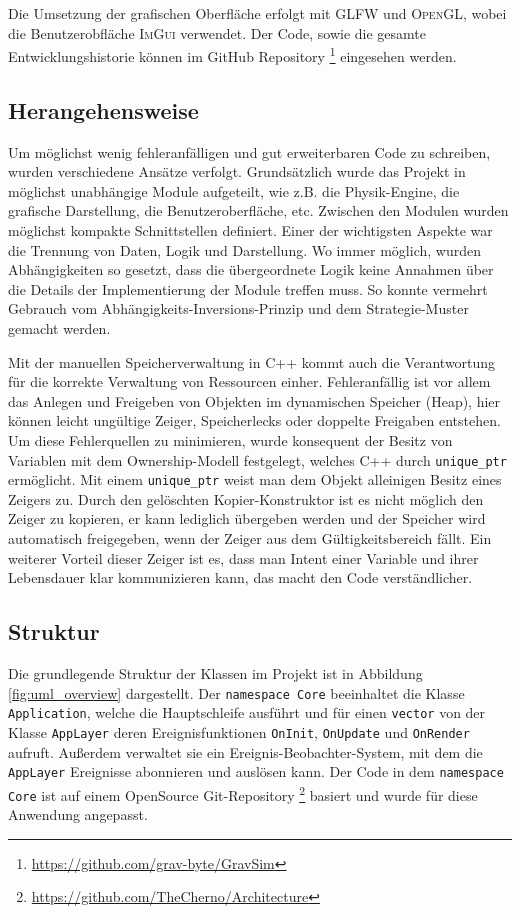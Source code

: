 \documentclass[10pt,twocolumn]{extarticle}
\begin{document}
Die Umsetzung der grafischen Oberfläche erfolgt mit \textsc{GLFW} und \textsc{OpenGL}, wobei die Benutzerobfläche \textsc{ImGui} verwendet. Der Code, sowie die gesamte Entwicklungshistorie können im GitHub Repository \footnote{\url{https://github.com/grav-byte/GravSim}} eingesehen werden.


\subsection{Herangehensweise}

Um möglichst wenig fehleranfälligen und gut erweiterbaren Code zu schreiben, wurden verschiedene Ansätze verfolgt. Grundsätzlich wurde das Projekt in möglichst unabhängige Module aufgeteilt, wie z.B. die Physik-Engine, die grafische Darstellung, die Benutzeroberfläche, etc. Zwischen den Modulen wurden möglichst kompakte Schnittstellen definiert. Einer der wichtigsten Aspekte war die Trennung von Daten, Logik und Darstellung. Wo immer möglich, wurden Abhängigkeiten so gesetzt, dass die übergeordnete Logik keine Annahmen über die Details der Implementierung der Module treffen muss. So konnte vermehrt Gebrauch vom Abhängigkeits-Inversions-Prinzip und dem Strategie-Muster gemacht werden.

Mit der manuellen Speicherverwaltung in C++ kommt auch die Verantwortung für die korrekte Verwaltung von Ressourcen einher. Fehleranfällig ist vor allem das Anlegen und Freigeben von Objekten im dynamischen Speicher (Heap), hier können leicht ungültige Zeiger, Speicherlecks oder doppelte Freigaben entstehen. Um diese Fehlerquellen zu minimieren, wurde konsequent der Besitz von Variablen mit dem Ownership-Modell festgelegt, welches C++ durch \texttt{unique\_ptr} ermöglicht. Mit einem \texttt{unique\_ptr} weist man dem Objekt alleinigen Besitz eines Zeigers zu. Durch den gelöschten Kopier-Konstruktor ist es nicht möglich den Zeiger zu kopieren, er kann lediglich übergeben werden und der Speicher wird automatisch freigegeben, wenn der Zeiger aus dem Gültigkeitsbereich fällt. Ein weiterer Vorteil dieser Zeiger ist es, dass man Intent einer Variable und ihrer Lebensdauer klar kommunizieren kann, das macht den Code verständlicher.


\subsection{Struktur}
Die grundlegende Struktur der Klassen im Projekt ist in Abbildung \ref{fig:uml_overview} dargestellt. Der \texttt{namespace Core} beeinhaltet die Klasse \texttt{Application}, welche die Hauptschleife ausführt und für einen \texttt{vector} von der Klasse \texttt{AppLayer} deren Ereignisfunktionen \texttt{OnInit}, \texttt{OnUpdate} und \texttt{OnRender} aufruft. Außerdem verwaltet sie ein Ereignis-Beobachter-System, mit dem die \texttt{AppLayer} Ereignisse abonnieren und auslösen kann. Der Code in dem \texttt{namespace Core} ist auf einem OpenSource Git-Repository \footnote{\url{https://github.com/TheCherno/Architecture}} basiert und wurde für diese Anwendung angepasst. 
\end{document}
